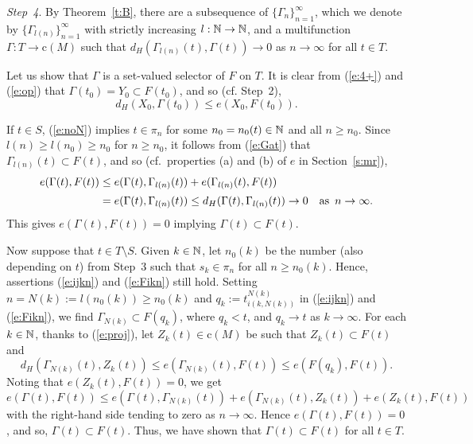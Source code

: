 \documentclass[preprint,12pt]{elsarticle}
\newcommand{\eq}[1]{\mbox{\rm(\ref{#1})}}
\begin{document}
\begin{pfBV}
\smallbreak
{\it Step~4}. By Theorem~\ref{t:B}, there are a subsequence of
$\{\Gamma_n\}_{n=1}^\infty$, which we denote by
$\{\Gamma_{l(n)}\}_{n=1}^\infty$ with strictly increasing $l:\mathbb{N}\to\mathbb{N}$, and
a multifunction $\Gamma:T\to\mbox{c}(M)$ such that
$d_H(\Gamma_{l(n)}(t),\Gamma(t))\to0$ as $n\to\infty$ for all $t\in T$.

Let us show that $\Gamma$ is a set-valued selector of $F$ on $T$. It is clear from
\eq{e:4+} and \eq{e:op} that $\Gamma(t_0)=Y_0\subset F(t_0)$, and so (cf. Step~2),
  \begin{equation} \label{e:Xo}
d_H(X_0,\Gamma(t_0))\le e(X_0,F(t_0)).
  \end{equation}

If $t\in S$, \eq{e:noN} implies $t\in\pi_n$ for some $n_0=n_0(t)\in\mathbb{N}$ and all $n\ge n_0$.
Since $l(n)\ge l(n_0)\ge n_0$ for $n\ge n_0$, it follows from \eq{e:Gat} that
$\Gamma_{l(n)}(t)\subset F(t)$, and so
(cf.\ properties (a) and (b) of $e$ in Section~\ref{s:mr}),
  \begin{align*}
e(\Gamma(t),F(t))&\le e(\Gamma(t),\Gamma_{l(n)}(t))
  +e(\Gamma_{l(n)}(t),F(t)) \\[2pt]
&=e(\Gamma(t),\Gamma_{l(n)}(t))\le d_H(\Gamma(t),\Gamma_{l(n)}(t))
  \to0\quad\mbox{as \,$n\to\infty$.}
  \end{align*}
This gives $e(\Gamma(t),F(t))=0$ implying $\Gamma(t)\subset F(t)$.

Now suppose that $t\in T\setminus S$. Given $k\in\mathbb{N}$, let $n_0(k)$ be the number
(also depending on $t$) from Step~3 such that $s_k\in\pi_n$ for all $n\ge n_0(k)$.
Hence, assertions \eq{e:ijkn} and \eq{e:Fikn} still hold. Setting
$n=N(k):=l(n_0(k))\ge n_0(k)$ and $q_k:=t_{i(k,N(k))}^{N(k)}$ in
\eq{e:ijkn} and \eq{e:Fikn}, we find $\Gamma_{N(k)}\subset F(q_k)$, where
$q_k<t$, and $q_k\to t$ as $k\to\infty$. For each $k\in\mathbb{N}$, thanks to \eq{e:proj},
let $Z_k(t)\in\mbox{c}(M)$ be such that $Z_k(t)\subset F(t)$ and
  \begin{equation*}
d_H(\Gamma_{N(k)}(t),Z_k(t))\le e(\Gamma_{N(k)}(t),F(t))\le e(F(q_k),F(t)).
  \end{equation*}
Noting that $e(Z_k(t),F(t))=0$, we get
  \begin{equation*}
e(\Gamma(t),F(t))\le e(\Gamma(t),\Gamma_{N(k)}(t))
  +e(\Gamma_{N(k)}(t),Z_k(t))+e(Z_k(t),F(t))
  \end{equation*}
with the right-hand side tending to zero as $n\!\to\!\infty$. Hence
\mbox{$e(\Gamma(t),F(t))\!=\!0$}, and so, $\Gamma(t)\subset F(t)$.
Thus, we have shown that $\Gamma(t)\subset F(t)$ for all $t\in T$.


\end{pfBV}
\end{document}
